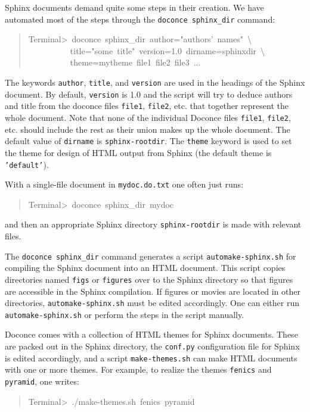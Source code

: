 \documentclass[a4paper]{article}
\begin{document}
Sphinx documents demand quite some steps in their creation. We have automated
most of the steps through the \texttt{doconce sphinx\_dir} command:
%
\begin{quote}{\ttfamily \raggedright \noindent
Terminal>~doconce~sphinx\_dir~author="authors'~names"~\textbackslash{}\\
~~~~~~~~~~title="some~title"~version=1.0~dirname=sphinxdir~\textbackslash{}\\
~~~~~~~~~~theme=mytheme~file1~file2~file3~...
}
\end{quote}

The keywords \texttt{author}, \texttt{title}, and \texttt{version} are used in the headings
of the Sphinx document. By default, \texttt{version} is 1.0 and the script
will try to deduce authors and title from the doconce files \texttt{file1},
\texttt{file2}, etc. that together represent the whole document. Note that
none of the individual Doconce files \texttt{file1}, \texttt{file2}, etc. should
include the rest as their union makes up the whole document.
The default value of \texttt{dirname} is \texttt{sphinx-rootdir}. The \texttt{theme}
keyword is used to set the theme for design of HTML output from
Sphinx (the default theme is \texttt{'default'}).

With a single-file document in \texttt{mydoc.do.txt} one often just runs:
%
\begin{quote}{\ttfamily \raggedright \noindent
Terminal>~doconce~sphinx\_dir~mydoc
}
\end{quote}

and then an appropriate Sphinx directory \texttt{sphinx-rootdir} is made with
relevant files.

The \texttt{doconce sphinx\_dir} command generates a script
\texttt{automake-sphinx.sh} for compiling the Sphinx document into an HTML
document.  This script copies directories named \texttt{figs} or \texttt{figures}
over to the Sphinx directory so that figures are accessible in the
Sphinx compilation.  If figures or movies are located in other
directories, \texttt{automake-sphinx.sh} must be edited accordingly. One
can either run \texttt{automake-sphinx.sh} or perform the steps in the
script manually.

Doconce comes with a collection of HTML themes for Sphinx documents.
These are packed out in the Sphinx directory, the \texttt{conf.py}
configuration file for Sphinx is edited accordingly, and a script
\texttt{make-themes.sh} can make HTML documents with one or more themes.
For example,
to realize the themes \texttt{fenics} and \texttt{pyramid}, one writes:
%
\begin{quote}{\ttfamily \raggedright \noindent
Terminal>~./make-themes.sh~fenics~pyramid
}
\end{quote}
\end{document}
